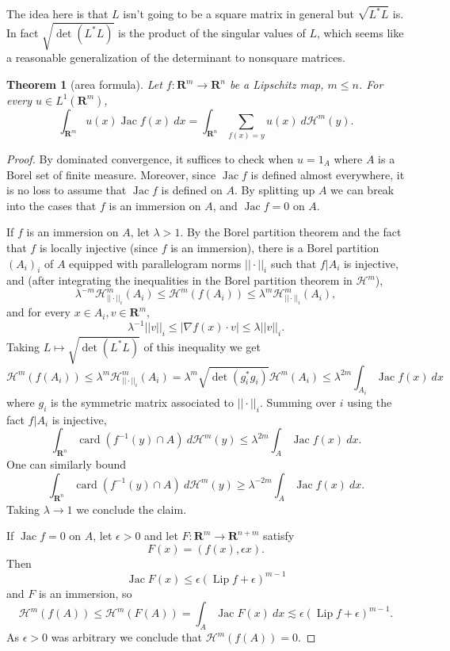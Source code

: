 \documentclass[reqno,12pt,letterpaper]{amsart}
\newcommand{\RR}{\mathbf{R}}
\DeclareMathOperator{\card}{card}
\DeclareMathOperator{\Jac}{Jac}
\DeclareMathOperator{\Lip}{Lip}
\newtheorem{theorem}{Theorem}[section]
\theoremstyle{definition}
\numberwithin{equation}{section}
\begin{document}
The idea here is that $L$ isn't going to be a square matrix in general but $\sqrt{L^*L}$ is.
In fact $\sqrt{\det(L^*L)}$ is the product of the singular values of $L$, which seems like a reasonable generalization of the determinant to nonsquare matrices.

\begin{theorem}[area formula]
Let $f: \RR^m \to \RR^n$ be a Lipschitz map, $m \leq n$.
For every $u \in L^1(\RR^m)$,
$$\int_{\RR^m} u(x) \Jac f(x) ~dx = \int_{\RR^n} \sum_{f(x) = y} u(x) ~d\mathcal H^m(y).$$
\end{theorem}
\begin{proof}
By dominated convergence, it suffices to check when $u = 1_A$ where $A$ is a Borel set of finite measure.
Moreover, since $\Jac f$ is defined almost everywhere, it is no loss to assume that $\Jac f$ is defined on $A$.
By splitting up $A$ we can break into the cases that $f$ is an immersion on $A$, and $\Jac f = 0$ on $A$.

If $f$ is an immersion on $A$, let $\lambda > 1$.
By the Borel partition theorem and the fact that $f$ is locally injective (since $f$ is an immersion), there is a Borel partition $(A_i)_i$ of $A$ equipped with parallelogram norms $||\cdot||_i$ such that $f|A_i$ is injective, and (after integrating the inequalities in the Borel partition theorem in $\mathcal H^m$),
$$\lambda^{-m} \mathcal H^m_{||\cdot||_i}(A_i) \leq \mathcal H^m(f(A_i)) \leq \lambda^m \mathcal H^m_{||\cdot||_i}(A_i),$$
and for every $x \in A_i,v \in \RR^m$,
$$\lambda^{-1} ||v||_i \leq |\nabla f(x) \cdot v| \leq \lambda ||v||_i.$$
Taking $L \mapsto \sqrt{\det(L^*L)}$ of this inequality we get
$$\mathcal H^m(f(A_i)) \leq \lambda^m \mathcal H^m_{||\cdot||_i}(A_i) = \lambda^m \sqrt{\det(g_i^*g_i)} \mathcal H^m(A_i) \leq \lambda^{2m} \int_{A_i} \Jac f(x) ~dx$$
where $g_i$ is the symmetric matrix associated to $||\cdot||_i$.
Summing over $i$ using the fact $f|A_i$ is injective,
$$\int_{\RR^n} \card(f^{-1}(y) \cap A) ~d\mathcal H^m(y) \leq \lambda^{2m} \int_A \Jac f(x) ~dx.$$
One can similarly bound
$$\int_{\RR^n} \card(f^{-1}(y) \cap A) ~d\mathcal H^m(y) \geq \lambda^{-2m} \int_A \Jac f(x) ~dx.$$
Taking $\lambda \to 1$ we conclude the claim.

If $\Jac f = 0$ on $A$, let $\epsilon > 0$ and let $F: \RR^m \to \RR^{n + m}$ satisfy
$$F(x) = (f(x), \epsilon x).$$
Then
$$\Jac F(x) \leq \epsilon(\Lip f + \epsilon)^{m - 1}$$
and $F$ is an immersion, so
$$\mathcal H^m(f(A)) \leq \mathcal H^m(F(A)) = \int_A \Jac F(x) ~dx \lesssim \epsilon(\Lip f + \epsilon)^{m - 1}.$$
As $\epsilon > 0$ was arbitrary we conclude that $\mathcal H^m(f(A)) = 0$.
\end{proof}
\end{document}
